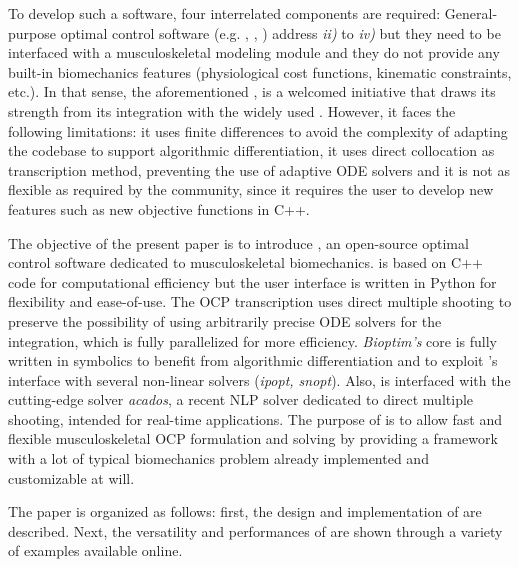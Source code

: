 To develop such a software, four interrelated components are required:  
General-purpose optimal control software (e.g. \gpopsii [\addref], \muscodii [\addref], \acado [\addref]) address \textit{ii)} to \textit{iv)} but they need to be interfaced with a musculoskeletal modeling module and they do not provide any built-in biomechanics features (physiological cost functions, kinematic constraints, etc.). 
In that sense, the aforementioned \moco, is a welcomed initiative that draws its strength from its integration with the widely used \opensim.
However, it faces the following limitations: it uses finite differences to avoid the complexity of adapting the \opensim codebase to support algorithmic differentiation, it uses direct collocation as transcription method, preventing the use of adaptive ODE solvers and it is not as flexible as required by the community, since it requires the user to develop new features such as new objective functions in C++. 

The objective of the present paper is to introduce \bioptim, an open-source optimal control software dedicated to musculoskeletal biomechanics.
\bioptim is based on C++ code for computational efficiency but the user interface is written in Python for flexibility and ease-of-use. 
The OCP transcription uses direct multiple shooting to preserve the possibility of using arbitrarily precise ODE solvers for the integration, which is fully parallelized for more efficiency.
\textit{Bioptim's} core is fully written in \casadi symbolics to benefit from algorithmic differentiation and to exploit \casadi 's interface with several non-linear solvers (\textit{ipopt, snopt}).
Also, \bioptim is interfaced with the cutting-edge solver \textit{acados}, a recent NLP solver dedicated to direct multiple shooting, intended for real-time applications.
The purpose of \bioptim is to allow fast and flexible musculoskeletal OCP formulation and solving by providing a framework with a lot of typical biomechanics problem already implemented and customizable at will.

The paper is organized as follows: first, the design and implementation of \bioptim are described.
Next, the versatility and performances of \bioptim are shown through a variety of examples available online. 
